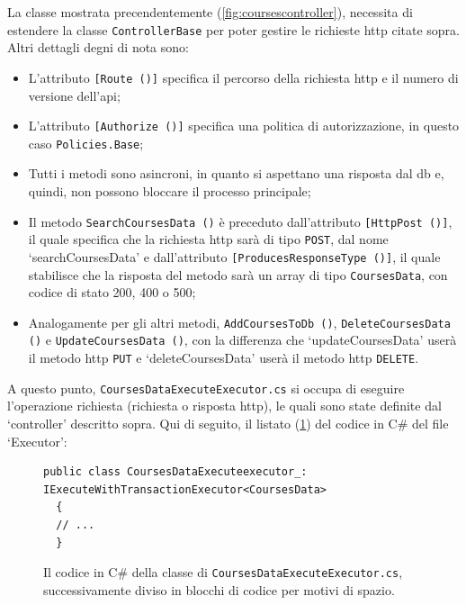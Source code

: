 La classe mostrata precendentemente (\ref{fig:coursescontroller}), necessita di estendere la classe \texttt{ControllerBase} per poter gestire le richieste \acrshort{http} citate sopra. Altri dettagli degni di nota sono:
\begin{itemize}
  \item L'attributo \texttt{[Route ()]} specifica il percorso della richiesta \acrshort{http} e il numero di versione dell'\acrshort{api};
  \item L'attributo \texttt{[Authorize ()]} specifica una politica di autorizzazione, in questo caso \texttt{Policies.Base};
  \item Tutti i metodi sono asincroni, in quanto si aspettano una risposta dal \acrshort{db} e, quindi, non possono bloccare il processo principale;
  \item Il metodo \texttt{SearchCoursesData ()} è preceduto dall'attributo \texttt{[HttpPost ()]}, il quale specifica che la richiesta \acrshort{http} sarà di tipo \texttt{POST}, dal nome `searchCoursesData' e dall'attributo \texttt{[ProducesResponseType ()]}, il quale stabilisce che la risposta del metodo sarà un array di tipo \texttt{CoursesData}, con codice di stato 200, 400 o 500;
  \item Analogamente per gli altri metodi, \texttt{AddCoursesToDb ()}, \texttt{DeleteCoursesData ()} e \texttt{UpdateCoursesData ()}, con la differenza che `updateCoursesData' userà il metodo \acrshort{http} \texttt{PUT} e `deleteCoursesData' userà il metodo \acrshort{http} \texttt{DELETE}.
\end{itemize}
A questo punto, \texttt{CoursesDataExecuteExecutor.cs} si occupa di eseguire l'operazione richiesta (richiesta o risposta \acrshort{http}), le quali sono state definite dal `controller' descritto sopra.
Qui di seguito, il listato (\ref{fig:coursesdataexecuteexecutor}) del codice in C\# del file `Executor':
\begin{figure}[H]
\begin{lstlisting}[label={lst:coursesdataexecuteexecutor}, linewidth=20cm, basicstyle=\tiny]
  public class CoursesDataExecuteexecutor_: IExecuteWithTransactionExecutor<CoursesData>
  {
  // ...
  }
\end{lstlisting}
\caption{\label{fig:coursesdataexecuteexecutor}Il codice in C\# della classe di \texttt{CoursesDataExecuteExecutor.cs}, successivamente diviso in blocchi di codice per motivi di spazio.}
\end{figure}

